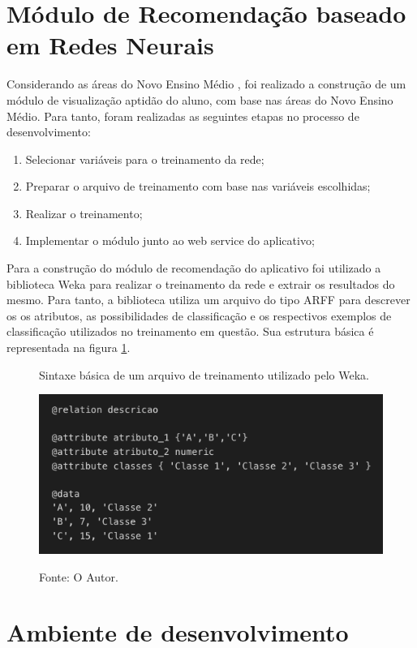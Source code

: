 \section{Módulo de Recomendação baseado em Redes Neurais}

Considerando as áreas do Novo Ensino Médio \cite{lei13415}, foi realizado a construção de um módulo de visualização aptidão do aluno, com base nas áreas do Novo Ensino Médio. Para tanto, foram realizadas as seguintes etapas no processo de desenvolvimento:

\begin{enumerate}
   \item Selecionar variáveis para o treinamento da rede;
   \item Preparar o arquivo de treinamento com base nas variáveis escolhidas;
   \item Realizar o treinamento;
   \item Implementar o módulo junto ao web service do aplicativo;
\end{enumerate}

Para a construção do módulo de recomendação do aplicativo foi utilizado a biblioteca Weka para realizar o treinamento da rede e extrair os resultados do mesmo. Para tanto, a biblioteca utiliza um arquivo do tipo ARFF para descrever os os atributos, as possibilidades de classificação e os respectivos exemplos de classificação utilizados no treinamento em questão. Sua estrutura básica é representada na figura \ref{figura:arff}.

\begin{figure}[H]
	\caption{Sintaxe básica de um arquivo de treinamento utilizado pelo Weka.}
	\centering %
	\includegraphics[width=12cm]{resources/arff.png} %
	\label{figura:arff}	
	\caption*{Fonte: O Autor.}
\end{figure}

\section{Ambiente de desenvolvimento}

